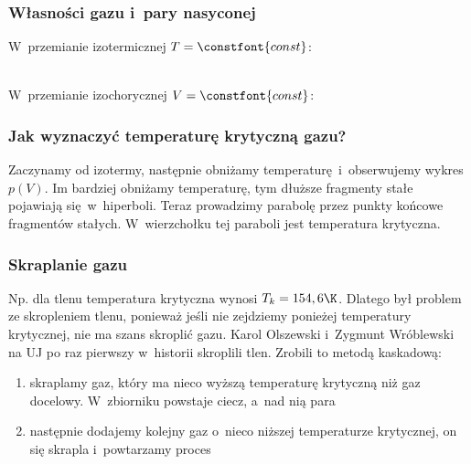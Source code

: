 \subsubsection*{Własności gazu i~pary nasyconej}
W~przemianie izotermicznej \(T = \constfont{const}\):
\begin{figure}[h!]
    \centering
\end{figure}\\
W~przemianie izochorycznej \(V = \constfont{const}\):
\begin{figure}[h!]
    \centering
\end{figure}
\subsubsection*{Jak wyznaczyć temperaturę krytyczną gazu?}
Zaczynamy od izotermy, następnie obniżamy temperaturę i~obserwujemy wykres \(p(V)\). Im bardziej obniżamy temperaturę, tym dłuższe fragmenty stałe pojawiają się w~hiperboli. Teraz prowadzimy parabolę przez punkty końcowe fragmentów stałych. W~wierzchołku tej paraboli jest temperatura krytyczna.
\subsubsection*{Skraplanie gazu}
Np. dla tlenu temperatura krytyczna wynosi \(T_k = 154,6\K\). Dlatego był problem ze skropleniem tlenu, ponieważ jeśli nie zejdziemy ponieżej temperatury krytycznej, nie ma szans skroplić gazu. Karol Olszewski i~Zygmunt Wróblewski na UJ po raz pierwszy w~historii skroplili tlen. Zrobili to metodą kaskadową:
\begin{enumerate}
    \item skraplamy gaz, który ma nieco wyższą temperaturę krytyczną niż gaz docelowy. W~zbiorniku powstaje ciecz, a~nad nią para
    \item następnie dodajemy kolejny gaz o~nieco niższej temperaturze krytycznej, on się skrapla i~powtarzamy proces
\end{enumerate}
